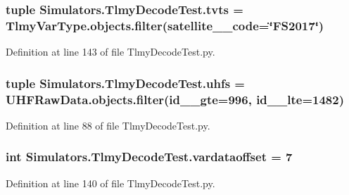 \subsubsection[{tvts}]{\setlength{\rightskip}{0pt plus 5cm}tuple Simulators.\+Tlmy\+Decode\+Test.\+tvts = Tlmy\+Var\+Type.\+objects.\+filter(satellite\+\_\+\+\_\+code=\char`\"{}F\+S2017\char`\"{})}\label{namespace_simulators_1_1_tlmy_decode_test_ae0b90d4bc7d21c2b3339c16cafb44c61}


Definition at line 143 of file Tlmy\+Decode\+Test.\+py.

\hypertarget{namespace_simulators_1_1_tlmy_decode_test_aca60722530e1ef3e8cc6fb977720f7c4}{}
\subsubsection[{uhfs}]{\setlength{\rightskip}{0pt plus 5cm}tuple Simulators.\+Tlmy\+Decode\+Test.\+uhfs = U\+H\+F\+Raw\+Data.\+objects.\+filter(id\+\_\+\+\_\+gte=996, id\+\_\+\+\_\+lte=1482)}\label{namespace_simulators_1_1_tlmy_decode_test_aca60722530e1ef3e8cc6fb977720f7c4}


Definition at line 88 of file Tlmy\+Decode\+Test.\+py.

\hypertarget{namespace_simulators_1_1_tlmy_decode_test_a050c65974d434e666339733f4804a983}{}
\subsubsection[{vardataoffset}]{\setlength{\rightskip}{0pt plus 5cm}int Simulators.\+Tlmy\+Decode\+Test.\+vardataoffset = 7}\label{namespace_simulators_1_1_tlmy_decode_test_a050c65974d434e666339733f4804a983}


Definition at line 140 of file Tlmy\+Decode\+Test.\+py.

